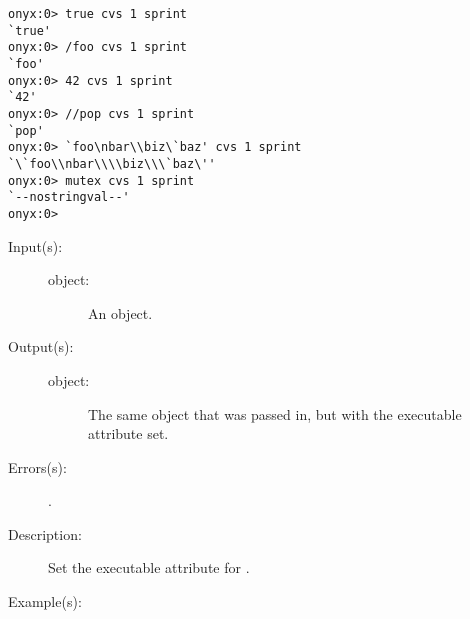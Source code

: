 \begin{description}
\begin{description}
\begin{verbatim}
onyx:0> true cvs 1 sprint
`true'
onyx:0> /foo cvs 1 sprint
`foo'
onyx:0> 42 cvs 1 sprint
`42'
onyx:0> //pop cvs 1 sprint
`pop'
onyx:0> `foo\nbar\\biz\`baz' cvs 1 sprint
`\`foo\\nbar\\\\biz\\\`baz\''
onyx:0> mutex cvs 1 sprint
`--nostringval--'
onyx:0>
		\end{verbatim}
	\end{description}
\label{systemdict:cvx}
\item[{\onyxop{object}{cvx}{object}}: ]
	\begin{description}\item[]
	\item[Input(s): ]
		\begin{description}\item[]
		\item[object: ]
			An object.
		\end{description}
	\item[Output(s): ]
		\begin{description}\item[]
		\item[object: ]
			The same object that was passed in, but with the
			executable attribute set.
		\end{description}
	\item[Errors(s): ]
		\begin{description}\item[]
		\item[.]
		\end{description}
	\item[Description: ]
		Set the executable attribute for .
	\item[Example(s): ]\begin{verbatim}


\end{verbatim}
\end{description}
\end{description}
